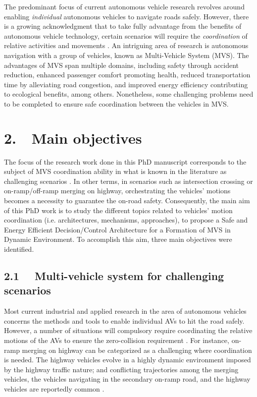 The predominant focus of current autonomous vehicle research revolves around enabling \textit{individual} autonomous vehicles to navigate roads safely. However, there is a growing acknowledgment that to take fully advantage from the benefits of autonomous vehicle technology, certain scenarios will require the \textit{coordination} of relative activities and movements \cite{6949576}. An intriguing area of research is autonomous navigation with a group of vehicles, known as Multi-Vehicle System (MVS). The advantages of MVS span multiple domains, including safety through accident reduction, enhanced passenger comfort promoting health, reduced transportation time by alleviating road congestion, and improved energy efficiency contributing to ecological benefits, among others. Nonetheless, some challenging problems need to be completed to ensure safe coordination between the vehicles in MVS. 



\section*{2.\, \,  Main objectives}

The focus of the research work done in this PhD manuscript corresponds to the subject of MVS coordination ability in what is known in the literature as challenging scenarios \cite{mariani2021coordination}. In other terms, in scenarios such as intersection crossing or on-ramp/off-ramp merging on highway, orchestrating the vehicles' motions becomes a necessity to guarantee the on-road safety. Consequently, the main aim of this PhD work is to study the different topics related to vehicles' motion coordination (i.e. architectures, mechanisms, approaches), to propose a Safe and Energy Efficient Decision/Control Architecture for a Formation of MVS in Dynamic Environment. To accomplish this aim, three main objectives were identified. 




\subsection*{2.1 \, \, Multi-vehicle system for challenging scenarios}

Most current industrial and applied research in the area of autonomous vehicles concerns the methods and tools to enable individual AVs to hit the road safely. However, a number of situations will compulsory require coordinating the relative motions of the AVs to ensure the zero-collision requirement \cite{mariani2021coordination}. For instance, on-ramp merging on highway can be categorized as a challenging where coordination is needed. The highway vehicles evolve in a highly dynamic environment imposed by the highway traffic nature; and conflicting trajectories among the merging vehicles, the vehicles navigating in the secondary on-ramp road, and the highway vehicles are reportedly common \cite{7562449}. 


